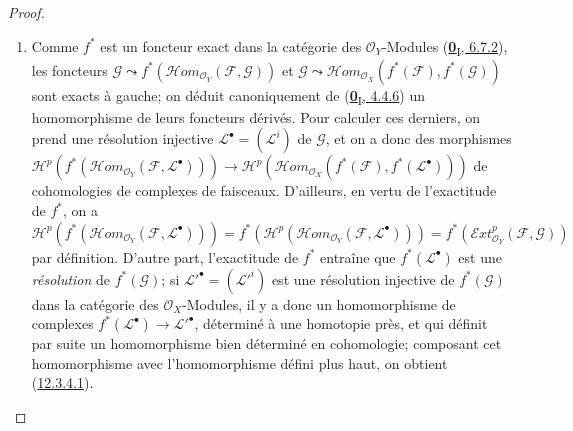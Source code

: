 \begin{proof}
\begin{enumerate}
\item[{\rm(i)}]
Comme $f^*$ est un foncteur exact dans la catégorie des
$\mathcal O_Y$-Modules (\hyperref[0.6.7.2-fr]{\textbf{0}\textsubscript{I}, 6.7.2}),
les foncteurs
$\mathcal G\leadsto f^*(\mathcal{H}om_{\mathcal O_Y}(\mathcal F,\mathcal G))$ et
$\mathcal G\leadsto\mathcal{H}om_{\mathcal O_X}(f^*(\mathcal F),f^*(\mathcal G))$
sont exacts à gauche; on déduit canoniquement de
(\hyperref[0.4.4.6-fr]{\textbf{0}\textsubscript{I}, 4.4.6}) un homomorphisme de leurs
foncteurs dérivés.
Pour calculer ces derniers, on prend une résolution injective
$\mathcal L^\bullet=(\mathcal L^i)$ de $\mathcal G$, et on a donc des
morphismes
$\mathcal H^p(f^*(\mathcal{H}om_{\mathcal O_Y}(\mathcal F,\mathcal L^\bullet)))\longrightarrow\mathcal H^p(\mathcal{H}om_{\mathcal O_X}(f^*(\mathcal F),f^*(\mathcal L^\bullet)))$
de cohomologies de complexes de faisceaux. D'ailleurs, en vertu de
l'exactitude de $f^*$, on a
$\mathcal H^p(f^*(\mathcal{H}om_{\mathcal O_Y}(\mathcal F,\mathcal L^\bullet)))=f^*(\mathcal H^p(\mathcal{H}om_{\mathcal O_Y}(\mathcal F,\mathcal L^\bullet)))=f^*(\mathcal{E}xt_{\mathcal O_Y}^p(\mathcal F,\mathcal G))$
par définition. D'autre part, l'exactitude de $f^*$ entraîne que
$f^*(\mathcal L^\bullet)$ est une \emph{résolution} de $f^*(\mathcal G)$; si
$\mathcal L'^\bullet=(\mathcal L'^{i})$ est une résolution injective de
$f^*(\mathcal G)$ dans la catégorie des $\mathcal O_X$-Modules, il y a donc
un homomorphisme de complexes
$f^*(\mathcal L^\bullet)\to\mathcal L'^\bullet$, déterminé à une homotopie
près, et qui définit par suite un homomorphisme bien déterminé en cohomologie;
composant cet homomorphisme avec l'homomorphisme défini plus haut, on obtient
(\hyperref[0.12.3.4.1-fr]{12.3.4.1}).


\end{enumerate}
\end{proof}
